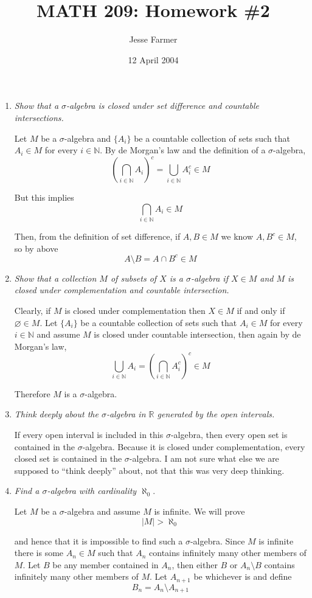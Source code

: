\documentclass[11pt]{article}
\title{MATH 209: Homework \#2}
\author{Jesse Farmer}
\date{12 April 2004}
\begin{document}
\maketitle
\begin{enumerate}
\item \emph{Show that a $\sigma$-algebra is closed under set difference and countable intersections.}

Let $M$ be a $\sigma$-algebra and $\{A_i\}$ be a countable collection of sets such that $A_i \in M$ for every $i \in \mathbb{N}$.  By de Morgan's law and the definition of a $\sigma$-algebra,
\[
\left(\bigcap_{i \in \mathbb{N}} A_i\right)^c = \bigcup_{i \in \mathbb{N}} A_i^c \in M
\]

But this implies
\[
\bigcap_{i \in \mathbb{N}} A_i \in M
\]

Then, from the definition of set difference, if $A,B \in M$ we know $A,B^c \in M$, so by above
\[
A \setminus B = A \cap B^c \in M
\]
\item \emph{Show that a collection $M$ of subsets of $X$ is a $\sigma$-algebra if $X \in M$ and $M$ is closed under complementation and countable intersection.}

Clearly, if $M$ is closed under complementation then $X \in M$ if and only if $\varnothing \in M$.  Let $\{A_i\}$ be a countable collection of sets such that $A_i \in M$ for every $i \in \mathbb{N}$ and assume $M$ is closed under countable intersection, then again by de Morgan's law,
\[
\bigcup_{i \in \mathbb{N}} A_i = \left(\bigcap_{i \in \mathbb{N}} A_i^c\right)^c \in M
\]

Therefore $M$ is a $\sigma$-algebra.

\item \emph{Think deeply about the $\sigma$-algebra in $\mathbb{R}$ generated by the open intervals.}

If every open interval is included in this $\sigma$-algebra, then every open set is contained in the $\sigma$-algebra.  Because it is closed under complementation, every closed set is contained in the $\sigma$-algebra.  I am not sure what else we are supposed to ``think deeply'' about, not that this was very deep thinking.

\item \emph{Find a $\sigma$-algebra with cardinality $\aleph_0.$}

Let $M$ be a $\sigma$-algebra and assume $M$ is infinite.  We will prove
\[
|M| > \aleph_0
\]

and hence that it is impossible to find such a $\sigma$-algebra.  Since $M$ is infinite there is some $A_n \in M$ such that $A_n$ contains infinitely many other members of $M$.  Let $B$ be any member contained in $A_n$, then either $B$ or $A_n \setminus B$ contains infinitely many other members of $M$.  Let $A_{n+1}$ be whichever is and define
\[
B_n = A_n \setminus A_{n+1}
\]


\end{enumerate}
\end{document}
